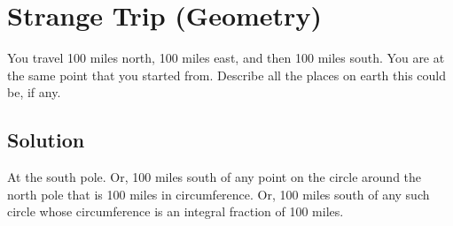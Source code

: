 \section{Strange Trip (Geometry)}
You travel 100 miles north, 100 miles east, and then 100 miles south. You are at the same point that you started from. Describe all the places on earth this could be, if any.

\subsection{Solution}
At the south pole. Or, 100 miles south of any point on the circle around the north pole that is 100 miles in circumference. Or, 100 miles south of any such circle whose circumference is an integral fraction of 100 miles.
